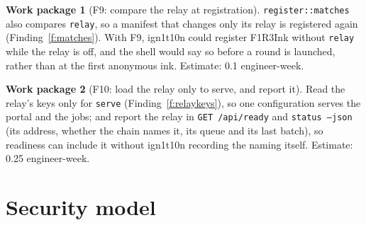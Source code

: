 \documentclass[11pt]{article}
\theoremstyle{definition}
\newtheorem{workpackage}{Work package}
\theoremstyle{remark}
\newcommand{\code}[1]{\texttt{#1}}
\newcommand{\Hr}{ign1t10n}
\begin{document}
\begin{workpackage}[F9: compare the relay at registration]\label{wp:f9}
\code{register::matches} also compares \code{relay}, so a manifest that changes only
its relay is registered again (Finding~\ref{f:matches}). With F9, \Hr{} could
register F1R3Ink without \code{relay} while the relay is off, and the shell would say
so before a round is launched, rather than at the first anonymous ink. Estimate: 0.1
engineer-week.
\end{workpackage}

\begin{workpackage}[F10: load the relay only to serve, and report it]\label{wp:f10}
Read the relay's keys only for \code{serve} (Finding~\ref{f:relaykeys}), so one
configuration serves the portal and the jobs; and report the relay in
\code{GET /api/ready} and \code{status --json} (its address, whether the chain names
it, its queue and its last batch), so readiness can include it without \Hr{}
recording the naming itself. Estimate: 0.25 engineer-week.
\end{workpackage}

\section{Security model}\label{sec:security}
\end{document}
